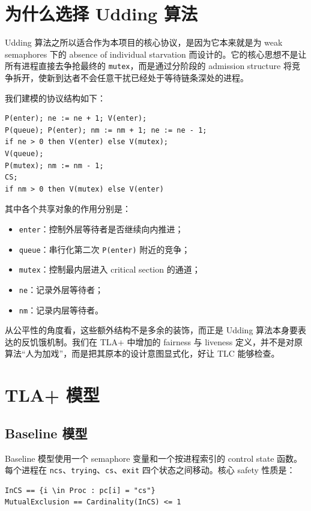 \documentclass[11pt]{ctexart}
\begin{document}
\section{为什么选择 Udding 算法}

Udding 算法之所以适合作为本项目的核心协议，是因为它本来就是为 weak semaphores 下的 absence of individual starvation 而设计的。它的核心思想不是让所有进程直接去争抢最终的 \texttt{mutex}，而是通过分阶段的 admission structure 将竞争拆开，使新到达者不会任意干扰已经处于等待链条深处的进程。

我们建模的协议结构如下：

\begin{lstlisting}
P(enter); ne := ne + 1; V(enter);
P(queue); P(enter); nm := nm + 1; ne := ne - 1;
if ne > 0 then V(enter) else V(mutex);
V(queue);
P(mutex); nm := nm - 1;
CS;
if nm > 0 then V(mutex) else V(enter)
\end{lstlisting}

其中各个共享对象的作用分别是：

\begin{itemize}
  \item \texttt{enter}：控制外层等待者是否继续向内推进；
  \item \texttt{queue}：串行化第二次 \texttt{P(enter)} 附近的竞争；
  \item \texttt{mutex}：控制最内层进入 critical section 的通道；
  \item \texttt{ne}：记录外层等待者；
  \item \texttt{nm}：记录内层等待者。
\end{itemize}

从公平性的角度看，这些额外结构不是多余的装饰，而正是 Udding 算法本身要表达的反饥饿机制。我们在 TLA+ 中增加的 fairness 与 liveness 定义，并不是对原算法“人为加戏”，而是把其原本的设计意图显式化，好让 TLC 能够检查。

\section{TLA+ 模型}

\subsection{Baseline 模型}

Baseline 模型使用一个 semaphore 变量和一个按进程索引的 control state 函数。每个进程在 \texttt{ncs}、\texttt{trying}、\texttt{cs}、\texttt{exit} 四个状态之间移动。核心 safety 性质是：

\begin{lstlisting}[language=TLA]
InCS == {i \in Proc : pc[i] = "cs"}
MutualExclusion == Cardinality(InCS) <= 1
\end{lstlisting}
\end{document}

